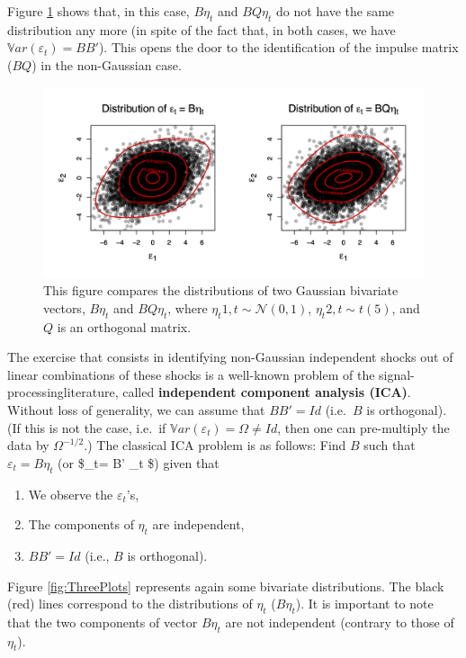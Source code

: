 \documentclass[
  12pt,
]{book}
\providecommand{\tightlist}{%
  \setlength{\itemsep}{0pt}\setlength{\parskip}{0pt}}
\theoremstyle{definition}
\theoremstyle{definition}
\theoremstyle{definition}
\theoremstyle{definition}
\theoremstyle{remark}
\begin{document}
Figure \ref{fig:preMadeFigureICAGaussianStudent} shows that, in this case, \(B \eta_t\) and \(BQ\eta_t\) do not have the same distribution any more (in spite of the fact that, in both cases, we have \(\mathbb{V}ar(\varepsilon_t)=BB'\)). This opens the door to the identification of the impulse matrix (\(BQ\)) in the non-Gaussian case.

\begin{figure}
\includegraphics[width=0.95\linewidth]{images/Figure_C} \caption{This figure compares the distributions of two Gaussian bivariate vectors, $B \eta_t$ and $BQ\eta_t$, where $\eta_t{1,t} \sim \mathcal{N}(0,1)$, $\eta_t{2,t} \sim t(5)$, and $Q$  is an orthogonal matrix.}\label{fig:preMadeFigureICAGaussianStudent}
\end{figure}

The exercise that consists in identifying non-Gaussian independent shocks out of linear combinations of these shocks is a well-known problem of the signal-processingliterature, called \textbf{independent component analysis (ICA)}. Without loss of generality, we can assume that \(BB' = Id\) (i.e.~\(B\) is orthogonal). (If this is not the case, i.e.~if \(\mathbb{V}ar(\varepsilon_t)=\Omega \ne Id\), then one can pre-multiply the data by \(\Omega^{-1/2}\).) The classical ICA problem is as follows: Find \(B\) such that \(\varepsilon_t = B \eta_t\) (or \$\eta\_t= B' \varepsilon\_t \$) given that

\begin{enumerate}
\def\labelenumi{\roman{enumi}.}
\tightlist
\item
  We observe the \(\varepsilon_t\)'s,
\item
  The components of \(\eta_t\) are independent,
\item
  \(BB'=Id\) (i.e., \(B\) is orthogonal).
\end{enumerate}

Figure \ref{fig:ThreePlots} represents again some bivariate distributions. The black (red) lines correspond to the distributions of \(\eta_t\) (\(B\eta_t\)). It is important to note that the two components of vector \(B \eta_t\) are not independent (contrary to those of \(\eta_t\)).
\end{document}
